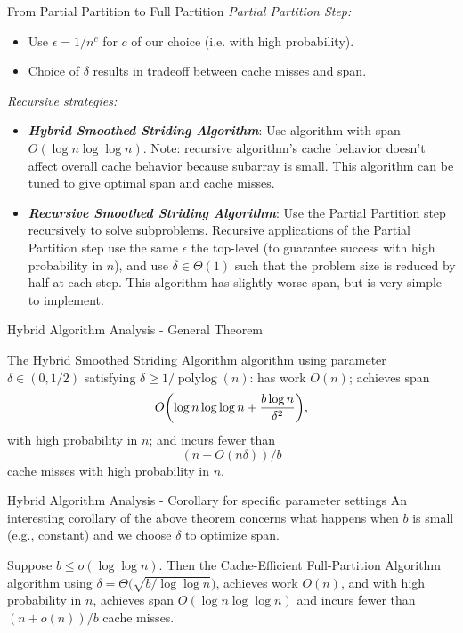 \documentclass[x11names, svgnames, rgb]{beamer}
\DeclarePairedDelimiter{\paren}{(}{)}
\newcommand{\polylog}{\operatorname{polylog}}
\newcommand{\defn}[1]       {{\textit{\textbf{\boldmath #1}}}}
\begin{document}
\begin{frame}[t]{From Partial Partition to Full Partition}
	\emph{Partial Partition Step:}
	\begin{itemize}
		\item Use $\epsilon = 1/n^c$ for $c$ of our choice (i.e. with high probability).
		\item Choice of $\delta$ results in tradeoff between cache misses and span.
	\end{itemize}
	\emph{Recursive strategies:}
	\begin{itemize}
		\item \defn{Hybrid Smoothed Striding Algorithm}: Use algorithm with span $O(\log n \log \log n)$. Note: recursive algorithm's cache behavior doesn't affect overall cache behavior because subarray is small. This algorithm can be tuned to give optimal span and cache misses.
		\item \defn{Recursive Smoothed Striding Algorithm}: Use the Partial Partition step recursively to solve subproblems. Recursive applications of the Partial Partition step use the same $\epsilon$ the top-level (to guarantee success with high probability in $n$), and use $\delta \in \Theta(1)$ such that the problem size is reduced by half at each step. This algorithm has slightly worse span, but is very simple to implement.
	\end{itemize}
\end{frame}



\begin{frame}[t]{Hybrid Algorithm Analysis - General Theorem}
\begin{theorem}
	The Hybrid Smoothed Striding Algorithm algorithm using parameter $\delta\in(0,1/2)$ satisfying $\delta \ge 1/\polylog(n)$: has work $O(n)$; achieves span
        $$O\paren*{\log n \log\log n +\frac{b\log n}{\delta^2}},$$
with high probability in $n$; and incurs fewer than 
$$(n+O(n\delta))/b$$
cache misses with high probability in $n$.
\end{theorem}
\end{frame}

\begin{frame}[t]{Hybrid Algorithm Analysis - Corollary for specific parameter settings}
An interesting corollary of the above theorem concerns what happens when $b$ is small (e.g., constant) and we choose $\delta$ to optimize span. 
\begin{corollary}
Suppose $b \le o(\log \log n)$. Then the Cache-Efficient Full-Partition Algorithm algorithm using $\delta = \Theta\big(\sqrt{b/\log\log n}\big)$, achieves work $O(n)$, and with high probability in $n$, achieves span $O(\log n \log\log n)$ and incurs fewer than $(n+o(n))/b$ cache misses.
\end{corollary}
\end{frame}
\end{document}
